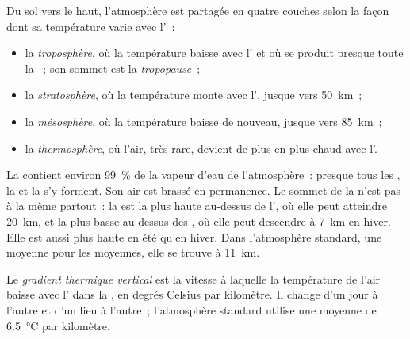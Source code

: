 \begin{definition}\label{def:g8:the-atmosphere:layers}
Du sol vers le haut, l'atmosphère est partagée en quatre couches selon la
façon dont sa température varie avec l'~:
\begin{itemize}
  \item la \emph{troposphère}, où la
        température baisse avec l' et où se produit presque toute
        la ~; son sommet est la \emph{tropopause}~;
  \item la \emph{stratosphère}, où la
        température monte avec l', jusque vers \qty{50}{km}~;
  \item la \emph{mésosphère}, où la
        température baisse de nouveau, jusque vers \qty{85}{km}~;
  \item la \emph{thermosphère}, où l'air,
        très rare, devient de plus en plus chaud avec l'.
\end{itemize}
\end{definition}

La  contient environ 99~\% de la vapeur d'eau de l'atmosphère~:
presque tous les , la  et la  s'y forment. Son air est
brassé en permanence. Le sommet de la  n'est pas à la même
 partout~: la  est la plus haute au-dessus de l',
où elle peut atteindre \qty{20}{km}, et la plus basse au-dessus des ,
où elle peut descendre à \qty{7}{km} en hiver. Elle est aussi plus haute
en été qu'en hiver. Dans l'atmosphère standard, une moyenne pour les
 moyennes, elle se trouve à \qty{11}{km}.

\begin{definition}\label{def:g8:the-atmosphere:lapse-rate}
Le \emph{gradient thermique vertical}
est la vitesse à laquelle la température de l'air baisse avec l'
dans la , en degrés Celsius par kilomètre. Il change d'un jour à
l'autre et d'un lieu à l'autre~; l'atmosphère standard utilise une moyenne
de \qty{6.5}{\degreeCelsius} par kilomètre.
\end{definition}


